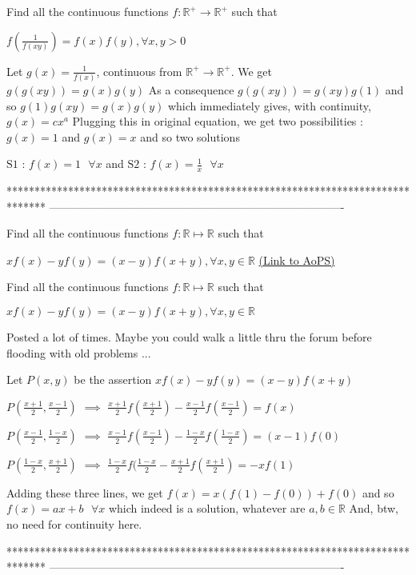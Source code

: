 \begin{solution}
	\begin{tcolorbox}Find all the continuous functions $f:\mathbb{R}^{+}\rightarrow \mathbb{R}^{+} $ such that  

$f\left (\frac{1}{f\left ( xy \right )}  \right )=f(x)f(y),\forall x,y> 0$\end{tcolorbox}
Let $g(x)=\frac 1{f(x)}$, continuous from $\mathbb R^+\to\mathbb R^+$. We get $g(g(xy))=g(x)g(y)$
As a consequence $g(g(xy))=g(xy)g(1)$ and so $g(1)g(xy)=g(x)g(y)$ which immediately gives, with continuity, $g(x)=c x^a$
Plugging this in original equation, we get two possibilities : $g(x)=1$ and $g(x)=x$ and so two solutions 

$\boxed{\text{S1 : }f(x)=1\text{  }\forall x}$ and $\boxed{\text{S2 : }f(x)=\frac 1x\text{  }\forall x}$
\end{solution}
*******************************************************************************
-------------------------------------------------------------------------------

\begin{problem}
	Find all the continuous functions $f : \mathbb{R} \mapsto\mathbb{R}$ such that  

$xf(x)-yf(y)=(x-y)f(x+y),\forall x,y\in \mathbb{R}$
	\flushright \href{https://artofproblemsolving.com/community/c6h618483}{(Link to AoPS)}
\end{problem}



\begin{solution}
	\begin{tcolorbox}Find all the continuous functions $f : \mathbb{R} \mapsto\mathbb{R}$ such that  

$xf(x)-yf(y)=(x-y)f(x+y),\forall x,y\in \mathbb{R}$\end{tcolorbox}
Posted a lot of times. Maybe you could walk a little thru the forum before flooding with old problems ...

Let $P(x,y)$ be the assertion $xf(x)-yf(y)=(x-y)f(x+y)$

$P(\frac{x+1}2,\frac{x-1}2)$ $\implies$ $\frac{x+1}2f(\frac{x+1}2)-\frac{x-1}2f(\frac{x-1}2)=f(x)$

$P(\frac{x-1}2,\frac{1-x}2)$ $\implies$ $\frac{x-1}2f(\frac{x-1}2)-\frac{1-x}2f(\frac{1-x}2)=(x-1)f(0)$

$P(\frac{1-x}2,\frac{x+1}2)$ $\implies$ $\frac{1-x}2f(\frac{1-x}2-\frac{x+1}2f(\frac{x+1}2)=-xf(1)$

Adding these three lines, we get $f(x)=x(f(1)-f(0))+f(0)$ and so $\boxed{f(x)=ax+b\text{  }\forall x}$ which indeed is a solution, whatever are $a,b\in\mathbb R$
And, btw, no need for continuity here.
\end{solution}
*******************************************************************************
-------------------------------------------------------------------------------

